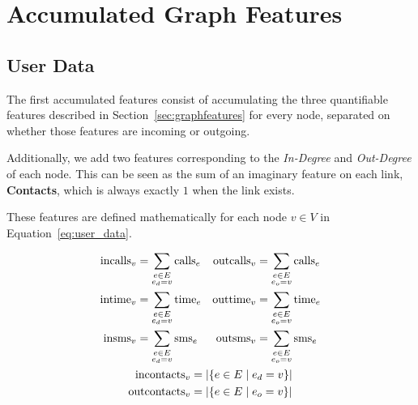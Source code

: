 \section{Accumulated Graph Features}
\label{sec:accumulatedfeatures}

\subsection{User Data}
\label{subsec:user_data}

The first accumulated features consist of accumulating the three quantifiable features described in Section~\ref{sec:graphfeatures} for every node, separated on whether those features are incoming or outgoing.

Additionally, we add two features corresponding to the \emph{In-Degree} and \emph{Out-Degree} of each node. This can be seen as the sum of an imaginary feature on each link, \textbf{Contacts}, which is always exactly $1$ when the link exists.

These features are defined mathematically for each node $v \in V$ in Equation~\ref{eq:user_data}.

\begin{equation}
\begin{gathered}
\begin{aligned}
\operatorname{incalls}_v &= \sum_{\substack{e \in E \\ e_d = v}} \operatorname{calls}_e &
\operatorname{outcalls}_v &= \sum_{\substack{e \in E \\ e_o = v}} \operatorname{calls}_e \\
\operatorname{intime}_v &= \sum_{\substack{e \in E \\ e_d = v}} \operatorname{time}_e &
\operatorname{outtime}_v &= \sum_{\substack{e \in E \\ e_o = v}} \operatorname{time}_e \\
\operatorname{insms}_v &= \sum_{\substack{e \in E \\ e_d = v}} \operatorname{sms}_e &
\operatorname{outsms}_v &= \sum_{\substack{e \in E \\ e_o = v}} \operatorname{sms}_e \\
\end{aligned} \\
\begin{aligned}
\operatorname{incontacts}_v &= \left| \left\{ e \in E \mid e_d = v \right\} \right| \\
\operatorname{outcontacts}_v &= \left| \left\{ e \in E \mid e_o = v \right\} \right|
\end{aligned}
\end{gathered}
\label{eq:user_data}
\end{equation}

